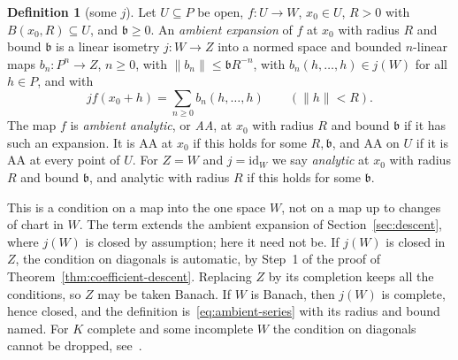\documentclass[11pt]{amsart}
\theoremstyle{definition}
\newtheorem{definition}[theorem]{Definition}
\theoremstyle{remark}
\numberwithin{equation}{section}
\newcommand{\id}{\mathrm{id}}
\newcommand{\norm}[1]{\lVert #1\rVert}
\theoremstyle{plain}
\theoremstyle{definition}
\theoremstyle{plain}
\begin{document}
\begin{definition}[some $j$]\label{amb:def:aa}
Let $U\subseteq P$ be open, $f\colon U\to W$, $x_0\in U$, $R>0$ with $B(x_0,R)\subseteq U$, and $\mathfrak b\ge0$. An \emph{ambient expansion} of $f$ at $x_0$ with radius $R$ and bound $\mathfrak b$ is a linear isometry $j\colon W\to Z$ into a normed space and bounded $n$-linear maps $b_n\colon P^n\to Z$, $n\ge0$, with $\norm{b_n}\le \mathfrak bR^{-n}$, with $b_n(h,\dots,h)\in j(W)$ for all $h\in P$, and with
\begin{equation}\label{amb:eq:aa}
 jf(x_0+h)=\sum_{n\ge0}b_n(h,\dots,h)\qquad(\norm h<R).
\end{equation}
The map $f$ is \emph{ambient analytic}, or \emph{AA}, at $x_0$ with radius $R$ and bound $\mathfrak b$ if it has such an expansion. It is AA at $x_0$ if this holds for some $R,\mathfrak b$, and AA on $U$ if it is AA at every point of $U$. For $Z=W$ and $j=\id_W$ we say \emph{analytic} at $x_0$ with radius $R$ and bound $\mathfrak b$, and analytic with radius $R$ if this holds for some $\mathfrak b$.
\end{definition}

This is a condition on a map into the one space $W$, not on a map up to changes of chart in $W$. The term extends the ambient expansion of Section~\ref{sec:descent}, where $j(W)$ is closed by assumption; here it need not be. If $j(W)$ is closed in $Z$, the condition on diagonals is automatic, by Step~1 of the proof of Theorem~\ref{thm:coefficient-descent}. Replacing $Z$ by its completion keeps all the conditions, so $Z$ may be taken Banach. If $W$ is Banach, then $j(W)$ is complete, hence closed, and the definition is~\eqref{eq:ambient-series} with its radius and bound named. For $K$ complete and some incomplete $W$ the condition on diagonals cannot be dropped, see~\cite{II}.
\end{document}
